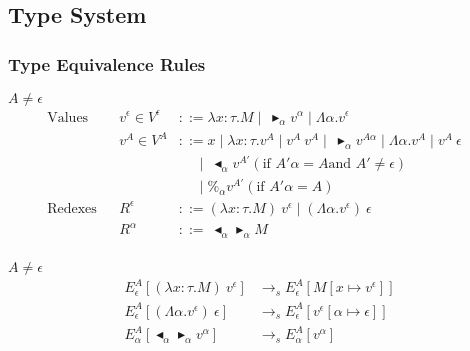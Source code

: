 \documentclass[runningheads]{llncs}
\newcommand{\TB}{\blacktriangleright}
\newcommand{\TBL}{\blacktriangleleft}
\begin{document}
\subsection{Type System}
\subsubsection{Type Equivalence Rules}

\begin{definition}[Values]
$A \neq \epsilon$\\
\begin{align*}
    \textrm{Values} && v^\epsilon \in V^\epsilon & ::= \lambda x:\tau.M \mid\ \TB_\alpha v^\alpha \mid \Lambda\alpha.v^\epsilon & \\
                    && v^A \in V^A & ::= x \mid \lambda x:\tau.v^A \mid v^A\ v^A \mid\ \TB_\alpha v^{A\alpha} 
                                           \mid \Lambda\alpha.v^A \mid v^A\ \epsilon &\\
                                    &&& \quad\   \mid\ \TBL_\alpha v^{A'} (\text{if } A'\alpha = A \text{and } A' \neq \epsilon) & \\
                                    &&& \quad\   \mid \%_\alpha v^{A'} (\text{if } A'\alpha = A) & \\
    \textrm{Redexes} && R^\epsilon & ::= (\lambda x:\tau.M)\ v^\epsilon \mid (\Lambda\alpha.v^\epsilon)\ \epsilon & \\
                     && R^\alpha & ::=\ \TBL_\alpha \TB_\alpha M & \\
\end{align*}
\end{definition}


\begin{definition}
$A \neq \epsilon$\\
\begin{align*}
    E^A_\epsilon [(\lambda x:\tau.M)\ v^\epsilon] & \longrightarrow_s E^A_\epsilon[M[x\mapsto v^\epsilon]] \\
    E^A_\epsilon [(\Lambda\alpha.v^\epsilon)\ \epsilon] & \longrightarrow_s E^A_\epsilon[v^\epsilon[\alpha\mapsto \epsilon]] \\
    E^A_\alpha [\TBL_\alpha \TB_\alpha v^\alpha] & \longrightarrow_s E^A_\alpha[v^\alpha] \\
\end{align*}
\end{definition}
\end{document}
